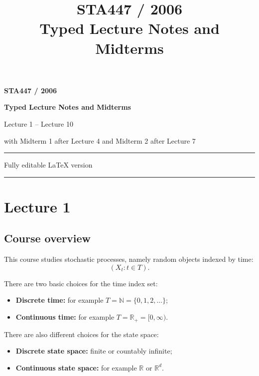 \documentclass[11pt]{article}
\title{\textbf{STA447 / 2006}\\[0.4em]\Huge Typed Lecture Notes and Midterms}
\author{}
\date{}
\theoremstyle{definition}
\begin{document}
\begin{titlepage}
    \centering
    \vspace*{2.5cm}
    {\Large \textbf{STA447 / 2006} \par}
    \vspace{0.6cm}
    {\Huge \textbf{Typed Lecture Notes and Midterms} \par}
    \vspace{0.7cm}
    {\Large Lecture 1 -- Lecture 10 \par}
    \vspace{0.3cm}
    {\Large with Midterm 1 after Lecture 4 and Midterm 2 after Lecture 7 \par}
    \vspace{1.2cm}
    \rule{0.8\textwidth}{0.8pt}
    \vspace{0.8cm}
    {\large Fully editable LaTeX version \par}
    \vfill
    \rule{0.8\textwidth}{0.8pt}
\end{titlepage}

\tableofcontents
\clearpage

\section{Lecture 1}

\subsection{Course overview}

This course studies stochastic processes, namely random objects indexed by time:
\[
(X_t : t\in T).
\]

There are two basic choices for the time index set:
\begin{itemize}[leftmargin=2em]
    \item \textbf{Discrete time:} for example \(T=\mathbb N=\{0,1,2,\dots\}\);
    \item \textbf{Continuous time:} for example \(T=\mathbb R_+=[0,\infty)\).
\end{itemize}

There are also different choices for the state space:
\begin{itemize}[leftmargin=2em]
    \item \textbf{Discrete state space:} finite or countably infinite;
    \item \textbf{Continuous state space:} for example \(\mathbb R\) or \(\mathbb R^d\).
\end{itemize}
\end{document}
